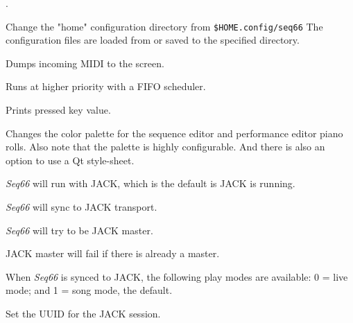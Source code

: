       .


      Change the "home" configuration directory from \texttt{\$HOME.config/seq66}
      The configuration files are loaded from or saved to the specified directory.

      Dumps incoming MIDI to the screen.

      Runs at higher priority with a FIFO scheduler.


      Prints pressed key value.

      Changes the color palette for the sequence editor and performance editor
      piano rolls.  Also note that the palette is highly configurable.
      And there is also an option to use a Qt style-sheet.


      \textsl{Seq66} will run with JACK, which is the default is JACK is
      running.


      \textsl{Seq66} will sync to JACK transport.


      \textsl{Seq66} will try to be JACK master.


      JACK master will fail if there is already a master.


      When \textsl{Seq66} is synced to JACK, the following play modes
      are available: 0 = live mode; and 1 = song mode, the default.


      Set the UUID for the JACK session.

